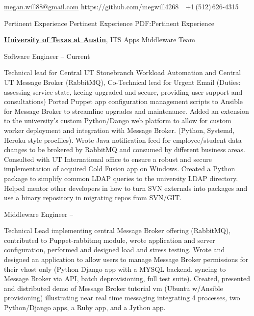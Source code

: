 \documentclass[letterpaper,MMMyyyy,nonstopmode]{simpleresumecv}
\newcommand{\ResumeAuthor}{Megan Will}
\begin{document}

\Title{\ResumeAuthor}
\begin{SubTitle}
\href{mailto:megan.will88@gmail.com}{megan.will88@gmail.com}
https://github.com/megwill4268
\,\SubBulletSymbol\,
+1\,(512)\,626-4315
\end{SubTitle}
\begin{Body}


\Section
{Pertinent Experience}
{Pertinent Experience}
{PDF:Pertinent Experience}

\Entry
\href{http://www.utexas.edu/}
{\textbf{University of Texas at Austin}},
ITS Apps Middleware Team 

\Gap
\BulletItem
Software Engineer
\hfill
{} -- Current
\begin{Detail}
\SubBulletItem
Technical lead for Central UT Stonebranch Workload Automation and Central UT Message Broker (RabbitMQ), Co-Technical lead for Urgent Email  (Duties: assessing service state, keeing upgraded and secure, providing user support and consultations)
\SubBulletItem
Ported Puppet app configuration management scripts to Ansible for Message Broker to streamline upgrades and maintenance. 
\SubBulletItem
Added an extension to the university's custom Python/Dango web platform to allow for custom worker deployment and integration with Message Broker. (Python, Systemd, Heroku style procfiles).
\SubBulletItem
Wrote Java notification feed for employee/student data changes to be brokered by RabbitMQ and consumed by different business areas. 
\SubBulletItem
Consulted with UT International office to ensure a robust and secure implementation of acquired Cold Fusion app on Windows.
\SubBulletItem
Created a Python package to simplify common LDAP queries to the university LDAP directory. 
\SubBulletItem
Helped mentor other developers in how to turn SVN externals into packages and use a binary repository in migrating repos from SVN/GIT. 
\end{Detail}

\Gap
\BulletItem
Middleware Engineer
\hfill
{} --
\begin{Detail}
\SubBulletItem
Technical Lead implementing central Message Broker offering (RabbitMQ), contributed to Puppet-rabbitmq module, wrote application and server configuration, performed and designed load and stress testing. 
\SubBulletItem
Wrote and designed an application to allow users to manage Message Broker permissions for their vhost only (Python Django app with a MYSQL backend, syncing to Message Broker via API, batch deprovisioning, full test suite).
\SubBulletItem
Created, presented and distributed demo of Message Broker tutorial vm (Ubuntu w/Ansible provisioning) illustrating near real time messaging integrating 4 processes, two Python/Django apps, a Ruby app, and a Jython app.
\end{Detail}


\end{Body}
\end{document}

